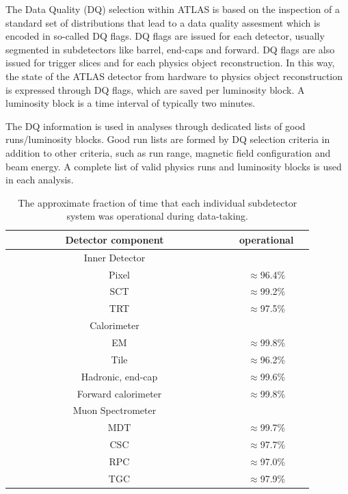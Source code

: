 The Data Quality (DQ) selection within ATLAS is based on the inspection of a standard set of distributions that lead to a data quality assesment which is encoded in so-called DQ flags. DQ flags are issued for each detector, usually segmented in subdetectors like barrel, end-caps and forward. DQ flags are also issued for trigger slices and for each physics object reconstruction. In this way, the state of the ATLAS detector from hardware to physics object reconstruction is expressed through DQ flags, which are saved per luminosity block. A luminosity block is a time interval of typically two minutes. 

The DQ information is used in analyses through dedicated lists of good runs/luminosity blocks. Good run lists are formed by DQ selection criteria in addition to other criteria, such as run range, magnetic field configuration and beam energy. A complete list of valid physics runs and luminosity blocks is used in each analysis.


\begin{table}[!hbt] %
\renewcommand{\arraystretch}{1.2}
\centering
\begin{tabular}{ | c | c |}
\hline
  ~~~~~~~~~~Detector component~~~~~~~~~~ &~~operational~~ \\ \hline
  Inner Detector         &   \\ 
  ~~Pixel     & $\approx$96.4\%  \\
  ~~SCT       & $\approx$99.2\%  \\
  ~~TRT       & $\approx$97.5\%  \\ \hline 
  Calorimeter               &   \\ 
  ~~EM                      & $\approx$99.8\%  \\
  ~~Tile                    & $\approx$96.2\%  \\
  ~~Hadronic, end-cap       & $\approx$99.6\%  \\ 
  ~~Forward calorimeter     & $\approx$99.8\%  \\ \hline 
  Muon Spectrometer         &   \\ 
  ~~MDT       & $\approx$99.7\%  \\
  ~~CSC       & $\approx$97.7\%  \\
  ~~RPC       & $\approx$97.0\%  \\ 
  ~~TGC       & $\approx$97.9\%  \\ \hline 
\end{tabular}
\caption{The approximate fraction of time that each individual subdetector system was operational during data-taking. }
\label{tb:operational}
\end{table}




